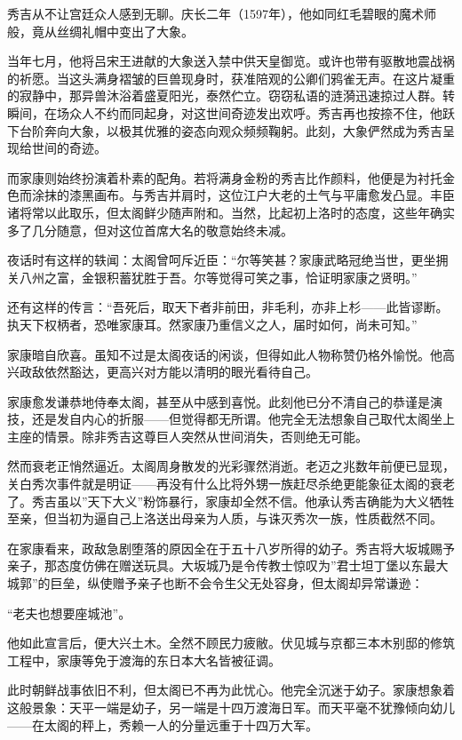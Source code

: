 \documentclass[
]{book}
\begin{document}
秀吉从不让宫廷众人感到无聊。庆长二年（1597年），他如同红毛碧眼的魔术师般，竟从丝绸礼帽中变出了大象。

当年七月，他将吕宋王进献的大象送入禁中供天皇御览。或许也带有驱散地震战祸的祈愿。当这头满身褶皱的巨兽现身时，获准陪观的公卿们鸦雀无声。在这片凝重的寂静中，那异兽沐浴着盛夏阳光，泰然伫立。窃窃私语的涟漪迅速掠过人群。转瞬间，在场众人不约而同起身，对这世间奇迹发出欢呼。秀吉再也按捺不住，他跃下台阶奔向大象，以极其优雅的姿态向观众频频鞠躬。此刻，大象俨然成为秀吉呈现给世间的奇迹。

而家康则始终扮演着朴素的配角。若将满身金粉的秀吉比作颜料，他便是为衬托金色而涂抹的漆黑画布。与秀吉并肩时，这位江户大老的土气与平庸愈发凸显。丰臣诸将常以此取乐，但太阁鲜少随声附和。当然，比起初上洛时的态度，这些年确实多了几分随意，但对这位首席大名的敬意始终未减。

夜话时有这样的轶闻：太阁曾呵斥近臣：``尔等笑甚？家康武略冠绝当世，更坐拥关八州之富，金银积蓄犹胜于吾。尔等觉得可笑之事，恰证明家康之贤明。''

还有这样的传言：``吾死后，取天下者非前田，非毛利，亦非上杉------此皆谬断。执天下权柄者，恐唯家康耳。然家康乃重信义之人，届时如何，尚未可知。''

家康暗自欣喜。虽知不过是太阁夜话的闲谈，但得如此人物称赞仍格外愉悦。他高兴政敌依然豁达，更高兴对方能以清明的眼光看待自己。

家康愈发谦恭地侍奉太阁，甚至从中感到喜悦。此刻他已分不清自己的恭谨是演技，还是发自内心的折服------但觉得都无所谓。他完全无法想象自己取代太阁坐上主座的情景。除非秀吉这尊巨人突然从世间消失，否则绝无可能。

然而衰老正悄然逼近。太阁周身散发的光彩骤然消逝。老迈之兆数年前便已显现，关白秀次事件就是明证------再没有什么比将外甥一族赶尽杀绝更能象征太阁的衰老了。秀吉虽以''天下大义''粉饰暴行，家康却全然不信。他承认秀吉确能为大义牺牲至亲，但当初为逼自己上洛送出母亲为人质，与诛灭秀次一族，性质截然不同。

在家康看来，政敌急剧堕落的原因全在于五十八岁所得的幼子。秀吉将大坂城赐予亲子，那态度仿佛在赠送玩具。大坂城乃是令传教士惊叹为''君士坦丁堡以东最大城郭''的巨垒，纵使赠予亲子也断不会令生父无处容身，但太阁却异常谦逊：

``老夫也想要座城池''。

他如此宣言后，便大兴土木。全然不顾民力疲敝。伏见城与京都三本木别邸的修筑工程中，家康等免于渡海的东日本大名皆被征调。

此时朝鲜战事依旧不利，但太阁已不再为此忧心。他完全沉迷于幼子。家康想象着这般景象：天平一端是幼子，另一端是十四万渡海日军。而天平毫不犹豫倾向幼儿------在太阁的秤上，秀赖一人的分量远重于十四万大军。
\end{document}
